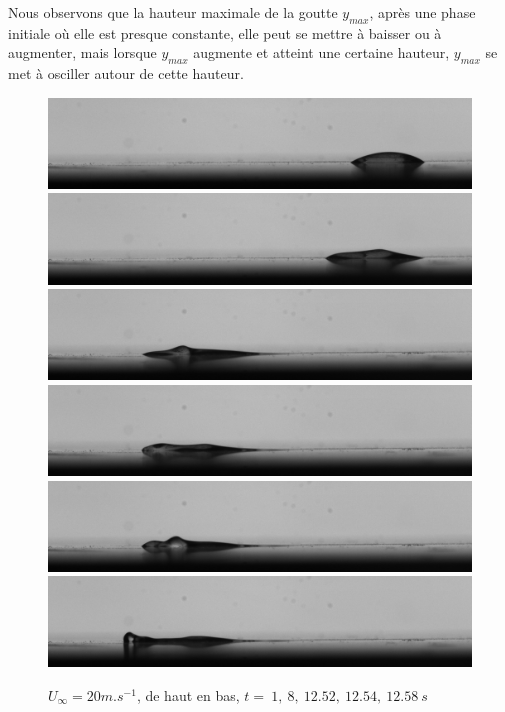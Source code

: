 \documentclass[french]{article}
\begin{document}
Nous observons que la hauteur maximale de la goutte $y_{max}$, après une phase initiale où elle est presque constante, elle peut se mettre à baisser ou à augmenter, mais lorsque $y_{max}$ augmente et atteint une certaine hauteur, $y_{max}$ se met à osciller autour de cette hauteur.
\newpage
\begin{figure}[!ht]
		\includegraphics[width = \linewidth]{./image/test.jpg}
		\includegraphics[width = \linewidth]{./image/test400.jpg}
		\includegraphics[width = \linewidth]{./image/test626.jpg}
		\includegraphics[width = \linewidth]{./image/test627.jpg}
		\includegraphics[width = \linewidth]{./image/test628.jpg}
		\includegraphics[width = \linewidth]{./image/test629.jpg}
	\caption{$U_{\infty}=20m.s^{-1}$, de haut en bas, 
	$t = ~1,~8,~12.52,~12.54,~12.58~s$}
		\label{fig:test}
\end{figure}
\end{document}

